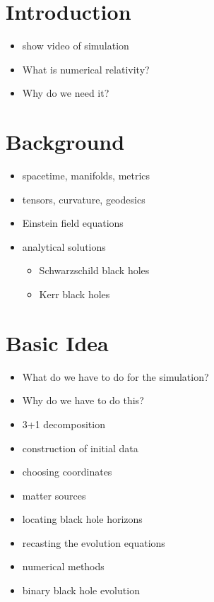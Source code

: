 \documentclass[twocolumn]{article}
\begin{document}
  \cleardoublepage

  \section{Introduction} %
  \label{sec:introduction}
    \begin{itemize}
      \item show video of simulation
      \item What is numerical relativity?
      \item Why do we need it?
    \end{itemize}

  \section{Background} %
  \label{sec:background}
    \begin{itemize}
      \item spacetime, manifolds, metrics
      \item tensors, curvature, geodesics
      \item Einstein field equations
      \item analytical solutions
        \begin{itemize}
          \item Schwarzschild black holes
          \item Kerr black holes
        \end{itemize}
    \end{itemize}

  \section{Basic Idea} %
  \label{sec:basic_idea}
    \begin{itemize}
      \item What do we have to do for the simulation?
      \item Why do we have to do this?
    \end{itemize}
    \begin{itemize}
      \item 3+1 decomposition
      \item construction of initial data
      \item choosing coordinates
      \item matter sources
      \item locating black hole horizons
      \item recasting the evolution equations
      \item numerical methods
      \item binary black hole evolution
    \end{itemize}
\end{document}
